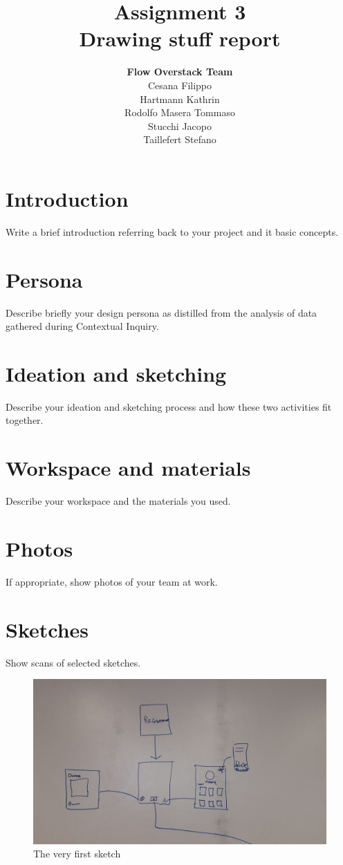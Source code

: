 \documentclass[12pt]{scrartcl}
\title{Assignment 3\\ Drawing stuff report}
\author{\textbf{Flow Overstack Team}\\ Cesana Filippo\\ Hartmann Kathrin\\ Rodolfo Masera Tommaso\\ Stucchi Jacopo\\ Taillefert Stefano}
\date{}
\begin{document}
\maketitle

\section{Introduction}

	Write a brief introduction referring back to your project and it basic concepts.

\section{Persona}

	Describe briefly your design persona as distilled from the analysis of data gathered during Contextual Inquiry.

\section{Ideation and sketching}

	Describe your ideation and sketching process and how these two activities fit together.

\section{Workspace and materials}

	Describe your workspace and the materials you used.
	
\section{Photos}

	If appropriate, show photos of your team at work.
	
	
\section{Sketches}
	
	Show scans of selected sketches.
	
	\begin{figure}[H]
        		\centering
       		\includegraphics[width=\textwidth]{design1.jpg}
       		\caption{The very first sketch}
        		\label{sketch1}
	\end{figure}
	
\end{document}
